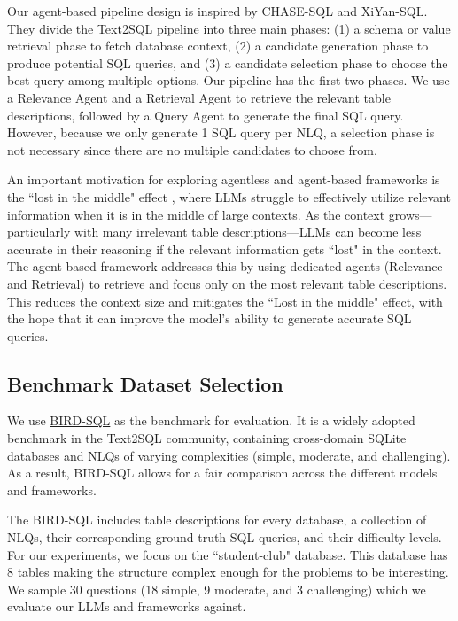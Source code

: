 \documentclass[10pt,twocolumn]{article}
\begin{document}
Our agent-based pipeline design is inspired by CHASE-SQL and XiYan-SQL. They divide the Text2SQL pipeline into three main phases: (1) a schema or value retrieval phase to fetch database context, (2) a candidate generation phase to produce potential SQL queries, and (3) a candidate selection phase to choose the best query among multiple options. Our pipeline has the first two phases. We use a Relevance Agent and a Retrieval Agent to retrieve the relevant table descriptions, followed by a Query Agent to generate the final SQL query. However, because we only generate 1 SQL query per NLQ, a selection phase is not necessary since there are no multiple candidates to choose from.

An important motivation for exploring agentless and agent-based frameworks is the ``lost in the middle" effect \cite{lostinmiddle}, where LLMs struggle to effectively utilize relevant information when it is in the middle of large contexts. As the context grows---particularly with many irrelevant table descriptions---LLMs can become less accurate in their reasoning if the relevant information gets ``lost" in the context. The agent-based framework addresses this by using dedicated agents (Relevance and Retrieval) to retrieve and focus only on the most relevant table descriptions. This reduces the context size and mitigates the ``Lost in the middle" effect, with the hope that it can improve the model's ability to generate accurate SQL queries.

\subsection{Benchmark Dataset Selection}

We use \href{https://bird-bench.github.io/}{BIRD-SQL} as the benchmark for evaluation. It is a widely adopted benchmark in the Text2SQL community, containing cross-domain SQLite databases and NLQs of varying complexities (simple, moderate, and challenging). As a result, BIRD-SQL allows for a fair comparison across the different models and frameworks.

The BIRD-SQL includes table descriptions for every database, a collection of NLQs, their corresponding ground-truth SQL queries, and their difficulty levels. For our experiments, we focus on the ``student-club" database. This database has 8 tables making the structure complex enough for the problems to be interesting. We sample 30 questions (18 simple, 9 moderate, and 3 challenging) which we evaluate our LLMs and frameworks against.
\end{document}
